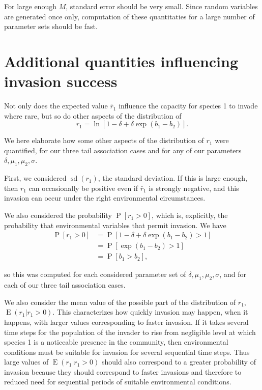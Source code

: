 \documentclass[letterpaper,11pt]{article}
\DeclareMathOperator{\EX}{E}%
\DeclareMathOperator{\sd}{sd}
\DeclareMathOperator{\Prob}{P}
\begin{document}
\noindent For large enough $M$, standard error should be very small. Since random variables are generated once only, computation of these quantitaties for a large number of parameter sets should be fast. 


\section{Additional quantities influencing invasion success} \label{sect:addquant}

Not only does the expected value $\bar r_1$ influence the capacity for species 1 to invade where rare, but so do other aspects of the distribution of
\begin{equation}
r_1 = \ln[1-\delta+\delta \exp(b_1-b_2)]. \label{r1_distribution}
\end{equation}

We here elaborate how some other aspects of the distribution of $r_1$ were quantified, for our three tail association cases and for any of our parameters $\delta, \mu_1, \mu_2, \sigma$. 

First, we considered $\sd(r_1)$, the standard deviation. If this is large enough, then $r_1$ can occasionally be positive even if $\bar r_1$ is strongly negative, and this invasion can occur under the right environmental circumstances.

We also considered the probability $\Prob[r_1 >0]$, which is, explicitly, the probability that environmental variables that permit invasion. We have
\begin{align}
\Prob[r_1>0] &= \Prob [1-\delta+\delta \exp(b_1-b_2) > 1] \\
&= \Prob[\exp (b_1-b_2)>1] \\
&= \Prob[b_1>b_2],
\end{align}

\noindent so this was computed for each considered parameter set of $\delta, \mu_1, \mu_2, \sigma$, and for each of our three tail association cases. 

We also consider the mean value of the possible part of the distribution of $r_1$, $\EX(r_1|r_1>0)$. 
This characterizes how quickly invasion may happen, when it happens, with larger values corresponding to faster invasion. 
If it takes several time steps for the population of the invader to rise from negligible level at which species 1 is a noticeable presence in the community, then environmental conditions must be suitable for invasion for several sequential time steps. 
Thus large values of $\EX(r_1|r_1>0)$ should also correspond to a greater probability of invasion because they should correspond to faster invasions and therefore to reduced need for sequential periods of suitable environmental conditions. 
\end{document}
